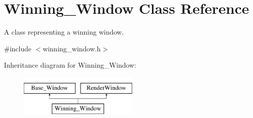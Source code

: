 \hypertarget{classWinning__Window}{}\section{Winning\+\_\+\+Window Class Reference}
\label{classWinning__Window}


A class representing a winning window.  




{\ttfamily \#include $<$winning\+\_\+window.\+h$>$}

Inheritance diagram for Winning\+\_\+\+Window\+:\begin{figure}[H]
\begin{center}
\leavevmode
\includegraphics[height=2.000000cm]{classWinning__Window}
\end{center}
\end{figure}
